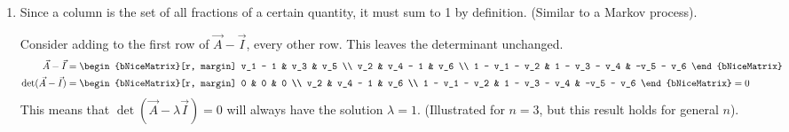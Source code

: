 \begin{enumerate}
    \item Since a column is the set of all fractions of a certain quantity, it
          must sum to 1 by definition. (Similar to a Markov process). \par
          Consider adding to the first row of $ \vec{A} - \vec{I} $,
          every other row. This leaves the determinant unchanged.
          \begin{align}
              \vec{A} - \vec{I}       &
              = \begin{bNiceMatrix}[r, margin]
                    v_1 - 1       & v_3           & v_5        \\
                    v_2           & v_4 - 1       & v_6        \\
                    1 - v_1 - v_2 & 1 - v_3 - v_4 & -v_5 - v_6
                \end{bNiceMatrix} \\
              \det(\vec{A} - \vec{I}) &
              = \begin{bNiceMatrix}[r, margin]
                    0             & 0             & 0          \\
                    v_2           & v_4 - 1       & v_6        \\
                    1 - v_1 - v_2 & 1 - v_3 - v_4 & -v_5 - v_6
                \end{bNiceMatrix} = 0
          \end{align}
          This means that $ \det(\vec{A} - \lambda\vec{I}) = 0 $ will always have the
          solution $ \lambda = 1 $. (Illustrated for $ n = 3 $, but this result holds
          for general $ n $).


\end{enumerate}

